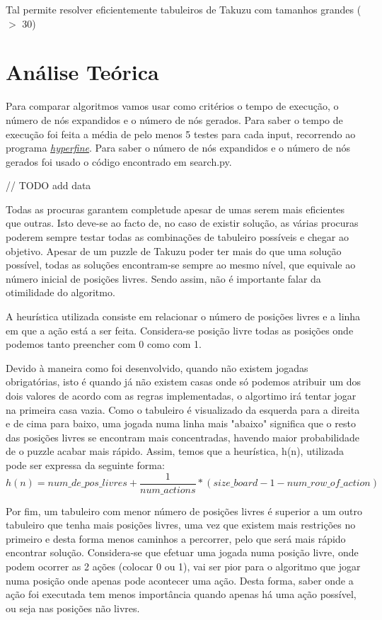 \documentclass[12pt,a4paper]{article}
\begin{document}
  Tal permite resolver eficientemente tabuleiros de Takuzu com tamanhos grandes ($>$ 30)
  

  \section{Análise Teórica}

  Para comparar algoritmos vamos usar como critérios o tempo de execução, o número de nós expandidos e o número de nós gerados.
  Para saber o tempo de execução foi feita a média de pelo menos 5 testes para cada input, recorrendo ao programa \href{https://github.com/sharkdp/hyperfine}{\textit{hyperfine}}.
  Para saber o número de nós expandidos e o número de nós gerados foi usado o código encontrado em search.py.

  // TODO add data

  
  Todas as procuras garantem completude apesar de umas serem mais eficientes que outras. Isto deve-se ao facto de, no caso de existir solução, as várias procuras poderem sempre testar todas as combinações de tabuleiro possíveis e chegar ao objetivo.
  Apesar de um puzzle de Takuzu poder ter mais do que uma solução possível, todas as soluções encontram-se sempre ao mesmo nível, que equivale ao número inicial de posições livres. Sendo assim, não é importante falar da otimilidade do algoritmo.
  
  A heurística utilizada consiste em relacionar o número de posições livres e a linha em que a ação está a ser feita. Considera-se posição livre todas as posições onde podemos tanto preencher com 0 como com 1.
  
  Devido à maneira como foi desenvolvido, quando não existem jogadas obrigatórias, isto é quando já não existem casas onde só podemos atribuir um dos dois valores de acordo com as regras implementadas, o algortimo irá tentar jogar na primeira casa vazia.
  Como o tabuleiro é visualizado da esquerda para a direita e de cima para baixo, uma jogada numa linha mais "abaixo" significa que o resto das posições livres se encontram mais concentradas, havendo maior probabilidade de o puzzle acabar mais rápido.
  Assim, temos que a heurística, h(n), utilizada pode ser expressa da seguinte forma:
  $$
  h(n) = {num\_de\_pos\_livres} + \frac{1}{num\_actions} * (size\_board - 1 - num\_row\_of\_action)
  $$

  Por fim, um tabuleiro com menor número de posições livres é superior a um outro tabuleiro que tenha mais posições livres, uma vez que existem mais restrições no primeiro e desta forma menos caminhos a percorrer, pelo que será mais rápido encontrar solução.
  Considera-se que efetuar uma jogada numa posição livre, onde podem ocorrer as 2 ações (colocar 0 ou 1), vai ser pior para o algoritmo que jogar numa posição onde apenas pode acontecer uma ação.
  Desta forma, saber onde a ação foi executada tem menos importância quando apenas há uma ação possível, ou seja nas posições não livres. 
  
\end{document}
